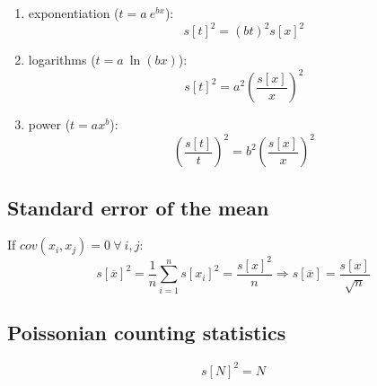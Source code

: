 \documentclass{article}
\begin{document}
\begin{multicols}{3}
\begin{enumerate}
\item{exponentiation ($t = a~e^{bx}$):}
\begin{equation}
s[t]^2 = (b t)^2 s[x]^2
\label{eq:exponentiation}
\end{equation}

\item{logarithms ($t = a~\ln(bx)$):}
\begin{equation}
s[t]^2 = a^2 \left(\frac{s[x]}{x}\right)^2
\label{eq:logarithms}
\end{equation}

\item{power ($t = a x^b$):}
\begin{equation}
\left(\frac{s[t]}{t}\right)^2 = b^2\left(\frac{s[x]}{x}\right)^2
\label{eq:power}
\end{equation}

\end{enumerate}

\subsection{Standard error of the mean}

If $cov(x_i,x_j)=0 ~\forall~ i, j$:
\begin{equation}
s[\overline{x}]^2 = \frac{1}{n} \sum_{i=1}^{n} s[x_i]^2 =
\frac{s[x]^2}{n} \Rightarrow s[\overline{x}] = \frac{s[x]}{\sqrt{n}}
\label{eq:varianceofthemean}
\end{equation}

\subsection{Poissonian counting statistics}

\begin{equation}
  s[N]^2 = N
\end{equation}

\end{multicols}
\end{document}
